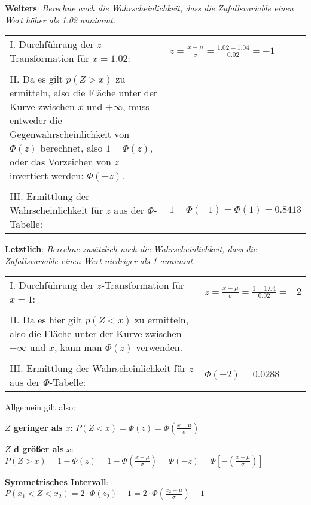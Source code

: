 \textbf{Weiters}: \emph{Berechne auch die Wahrscheinlichkeit, dass die Zufallsvariable einen Wert h\"{o}her als 1.02 annimmt.}

\begin{table}[h!]
	\begin{tabular}{p{10cm} l}
	I. Durchf\"{u}hrung der $z$-Transformation f\"{u}r $x = 1.02$: & $z = \frac{x - \mu}{\sigma} = \frac{1.02 - 1.04}{0.02} = -1$
	\\ & \\
	II. Da es gilt $p(Z > x)$ zu ermitteln, also die Fl\"{a}che unter der Kurve zwischen $x$ und $+\infty$, muss entweder die Gegenwahrscheinlichkeit von $\Phi(z)$ berechnet, also $1 - \Phi(z)$, oder das Vorzeichen von $z$ invertiert werden: $\Phi(-z)$. &
	\\ & \\
	III. Ermittlung der Wahrscheinlichkeit f\"{u}r $z$ aus der $\Phi$-Tabelle: & $1 - \Phi(-1) = \Phi(1) = 0.8413$
	\end{tabular}
\end{table}

\textbf{Letztlich}: \emph{Berechne zus\"{a}tzlich noch die Wahrscheinlichkeit, dass die Zufallsvariable einen Wert niedriger als 1 annimmt.}

\begin{table}[h!]
	\begin{tabular}{p{10cm} l}
	I. Durchf\"{u}hrung der $z$-Transformation f\"{u}r $x = 1$: & $z = \frac{x - \mu}{\sigma} = \frac{1 - 1.04}{0.02} = -2$
	\\ & \\
	II. Da es hier gilt $p(Z < x)$ zu ermitteln, also die Fl\"{a}che unter der Kurve zwischen $-\infty$ und $x$, kann man $\Phi(z)$ verwenden. &
	\\ & \\
	III. Ermittlung der Wahrscheinlichkeit f\"{u}r $z$ aus der $\Phi$-Tabelle: & $\Phi(-2) = 0.0288$
	\end{tabular}
\end{table}

Allgemein gilt also: 

\textbf{$Z$ geringer als $x$}: $P(Z < x) = \Phi(z) = \Phi\left(\frac{x - \mu}{\sigma}\right)$

\textbf{$Z$ d gr\"{o}\ss{}er als} $x$: $P(Z > x) = 1 - \Phi(z) = 1 - \Phi\left(\frac{x - \mu}{\sigma}\right) = \Phi(-z) = \Phi\left[-\left(\frac{x - \mu}{\sigma}\right)\right]$

\textbf{Symmetrisches Intervall}: $P(x_{1} < Z < x_{2}) = 2 \cdot \Phi(z_{2}) - 1 = 2 \cdot \Phi\left(\frac{x_{2} - \mu}{\sigma}\right) - 1$

